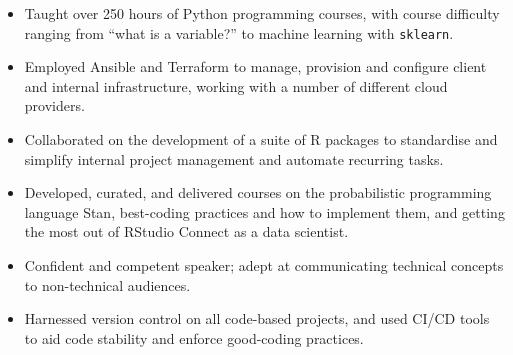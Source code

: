 \documentclass[12pt, a4paper]{article}
\begin{document}
\vspace{-.75em}


\begin{itemize}[
    itemsep=.05em,
    labelwidth=2em,
    leftmargin=1.25em,
    topsep=0em]

    \item[] 
                   {Taught over 250 hours of Python programming courses, with
                   course difficulty ranging from ``what is a variable?'' to
                   machine learning with \texttt{sklearn}.}%

    \item[] 
                   {Employed Ansible and Terraform to manage, provision and
                   configure client and internal infrastructure, working with a
                   number of different cloud providers.}%

    \item[] 
                   {Collaborated on the development of a suite of R packages to
                    standardise and simplify internal project management and
                    automate recurring tasks.}

    \item[] 
                   {Developed, curated, and delivered courses on the
                   probabilistic programming language Stan, best-coding
                   practices and how to implement them, and getting the most
                   out of RStudio Connect as a data scientist.}%

\end{itemize}



\begin{itemize}[
    itemsep=.05em,
    labelwidth=2em,
    leftmargin=0em,
    topsep=0em]

    \item[] 
                   {Confident and competent speaker; adept at communicating
                   technical concepts to non-technical audiences.}%

    \item[] 
                   {Harnessed version control on all code-based projects, and
                   used CI/CD tools to aid code stability and enforce
                   good-coding practices.}%

\end{itemize}
\end{document}

